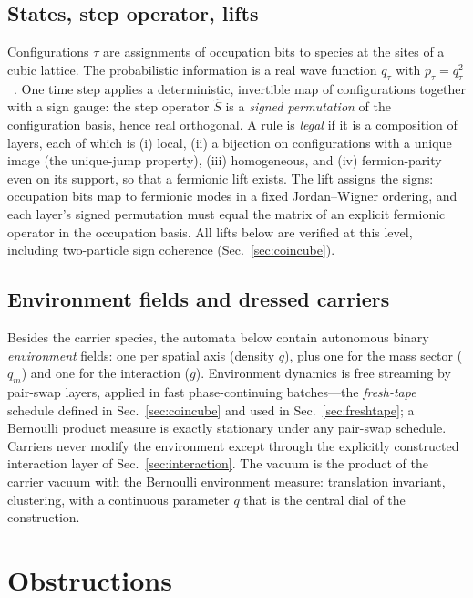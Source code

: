 \documentclass[aps,prd,twocolumn,superscriptaddress,nofootinbib,floatfix]{revtex4-2}
\begin{document}
\subsection{States, step operator, lifts}

Configurations $\tau$ are assignments of occupation bits to species at the
sites of a cubic lattice. The probabilistic information is a real wave
function $q_\tau$ with $p_\tau=q_\tau^2$~\cite{Wetterich2022}. One time
step applies a deterministic, invertible map of configurations together
with a sign gauge: the step operator $\hat S$ is a \emph{signed
permutation} of the configuration basis, hence real orthogonal. A rule is
\emph{legal} if it is a composition of layers, each of which is (i) local,
(ii) a bijection on configurations with a unique image (the unique-jump
property), (iii) homogeneous, and (iv) fermion-parity even on its support,
so that a fermionic lift exists. The lift assigns the signs: occupation
bits map to fermionic modes in a fixed Jordan--Wigner ordering, and each
layer's signed permutation must equal the matrix of an explicit fermionic
operator in the occupation basis. All lifts below are verified at this
level, including two-particle sign coherence (Sec.~\ref{sec:coincube}).

\subsection{Environment fields and dressed carriers}

Besides the carrier species, the automata below contain autonomous binary
\emph{environment} fields: one per spatial axis (density $q$), plus one for
the mass sector ($q_m$) and one for the interaction ($g$). Environment
dynamics is free streaming by pair-swap layers, applied in fast
phase-continuing batches---the \emph{fresh-tape} schedule defined in
Sec.~\ref{sec:coincube} and used in Sec.~\ref{sec:freshtape}; a
Bernoulli product measure is exactly stationary under any pair-swap
schedule. Carriers never modify the environment except through
the explicitly constructed interaction layer of Sec.~\ref{sec:interaction}.
The vacuum is the product of the carrier vacuum with the Bernoulli
environment measure: translation invariant, clustering, with a continuous
parameter $q$ that is the central dial of the construction.

\section{Obstructions}
\label{sec:obstructions}
\end{document}
